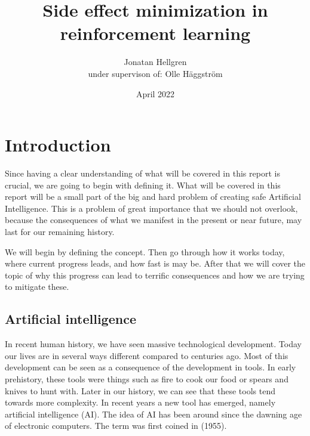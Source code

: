 \documentclass[12pt,A4]{report}
\title{Side effect minimization in reinforcement learning}
\author{Jonatan Hellgren\\
under supervison of: Olle Häggström}
\date{April 2022}
\theoremstyle{definition}
\begin{document}
\maketitle


\thispagestyle{empty}

\newpage
{}

\tableofcontents

\newpage
{}

% 

\chapter{Introduction}
Since having a clear understanding of what will be covered in this report is crucial, we are going to begin with defining it. What will be covered in this report will be a small part of the big and hard problem of creating safe Artificial Intelligence. This is a problem of great importance that we should not overlook, because the consequences of what we manifest in the present or near future, may last for our remaining history. 

We will begin by defining the concept. Then go through how it works today, where current progress leads, and how fast is may be. After that we will cover the topic of why this progress can lead to terrific consequences and how we are trying to mitigate these.


\section{Artificial intelligence}

In recent human history, we have seen massive technological development. Today our lives are in several ways different compared to centuries ago. Most of this development can be seen as a consequence of the development in tools. In early prehistory, these tools were things such as fire to cook our food or spears and knives to hunt with. Later in our history, we can see that these tools tend towards more complexity. In recent years a new tool has emerged, namely artificial intelligence (AI). The idea of AI has been around since the dawning age of electronic computers. The term was first coined in \autocite{John McCarthy et al} (1955).
\end{document}
